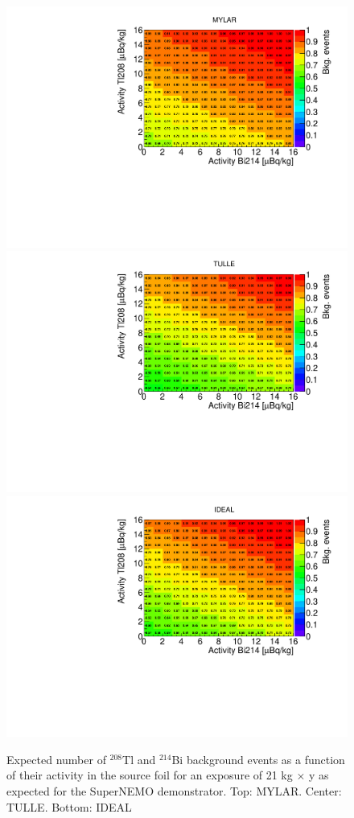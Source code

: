 \documentclass[main.tex]{subfiles}
\begin{document}
\begin{figure}[h!]
\centering
\includegraphics[scale=0.5]{pictures/Chap4/MYLAR_all.pdf}
\includegraphics[scale=0.5]{pictures/Chap4/TULLE_all.pdf}
\includegraphics[scale=0.5]{pictures/Chap4/IDEAL_all.pdf}
\label{Nbkg_3designsTl208Bi214}
\caption{Expected number of $^{\text{208}}$Tl and $^{\text{214}}$Bi background events as a function of their activity in the source foil for an exposure of 21 kg $\times$ y as expected for the SuperNEMO demonstrator. Top: MYLAR. Center: TULLE. Bottom: IDEAL}
\end{figure}
\end{document}

